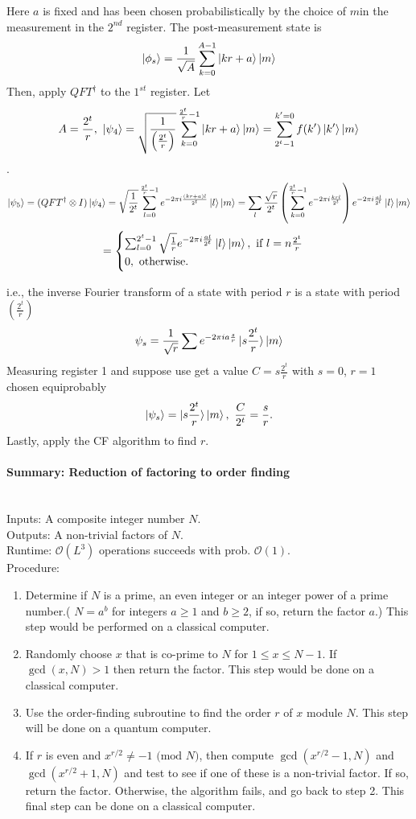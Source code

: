 \documentclass[]{book}
\theoremstyle{nonumberplain}
\begin{document}
Here $a$ is fixed and has been chosen probabilistically by the choice of $m$in the measurement in the $2^{nd}$ register. The post-measurement state is
$$\ket{\phi_{s}}=\frac{1}{\sqrt{A}}\sum_{k=0}^{A-1} \ket{kr+a}\ket{m}$$
Then, apply $QFT^{\dagger} $ to the $1^{st} $ register. Let $$A=\frac{2^t}{r}, \ \ket{\psi_4} = \sqrt{\frac{1}{\left( \frac{2^t}{r} \right)}} \sum_{k=0}^{\frac{2^t}{r}-1} \ket{kr+a}\ket{m} = \sum_{2^t-1}^{k'=0} f(k') \ket{k'} \ket{m} $$.
\[
\ket{\psi_5} = (QFT^{\dagger} \otimes I) \ket{\psi_4} = \sqrt{\frac{1}{2^t}} \sum_{l=0}^{\frac{2^t}{r}-1} e^{-2\pi i \frac{(kr+a)l}{2^t}} \ket{l} \ket{m} = \sum_{l}\frac{\sqrt{r}}{2^t} \left( \sum_{k=0}^{\frac{2^t}{r}-1} e^{-2\pi i \frac{krl}{2^t}} \right) e^{-2\pi i \frac{al}{2^{t}}} \ket{l} \ket{m} 
\]
\[
= 
\begin{cases}
    \sum_{l=0}^{2^t-1} \sqrt{\frac{1}{r}} e^{-2\pi i \frac{al}{2^t}} \ket{l} \ket{m}, \text{ if } l=n \frac{2^t}{r} \\
    0, \text{ otherwise}.
\end{cases}
\]

i.e., the inverse Fourier transform of a state with period $r$ is a state with period $\left( \frac{2^t}{r} \right)$
$$\psi_s = \frac{1}{\sqrt{r}} \sum e^{-2\pi i a \frac{s}{r}} \ket{s \frac{2^{t}}{r}} \ket{m} $$
Measuring register 1 and suppose use get a value $C=s\frac{2^t}{r}$ with $s=0$, $r=1$ chosen equiprobably
$$\ket{\psi_s} = \ket{s\frac{2^t}{r}}\ket{m}, \ \frac{C}{2^t} = \frac{s}{r}.$$
Lastly, apply the CF algorithm to find $r$.

\paragraph{Summary: Reduction of factoring to order finding}\\
Inputs: A composite integer number $N$.\\
Outputs: A non-trivial factors of $N$.\\
Runtime: $\mathcal{O}(L^3)$ operations succeeds with prob. $\mathcal{O}(1)$.\\
Procedure:
\begin{enumerate}
    \item Determine if $N$ is a prime, an even integer or an integer power of a prime number.( $N=a^b$ for integers $a \geq 1$ and $b \geq 2$, if so, return the factor $a$.) This step would be performed on a classical computer.
    \item Randomly choose $x$ that is co-prime to $N$ for $1 \leq x \leq N-1$. If $\gcd(x,N)>1$ then return the factor. This step would be done on a classical computer.
    \item Use the order-finding subroutine to find the order $r$ of $x$ module $N$. This step will be done on a quantum computer.
    \item If $r$ is even and $x^{r/2} \neq -1 \text{ (mod }N)$, then  compute $\gcd(x^{r/2}-1, N)$ and $\gcd(x^{r/2}+1,N)$ and test to see if one of these is a non-trivial factor. If so, return the factor. Otherwise, the algorithm fails, and go back to step 2. This final step  can be done on a classical computer.
\end{enumerate}
\end{document}
